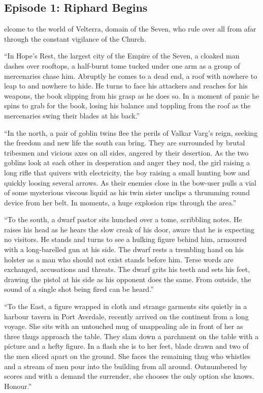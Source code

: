 \subsection{Episode 1: Riphard Begins}

elcome to the world of Velterra, domain of the Seven, who rule over all from afar through the constant vigilance of the Church.\medskip

“In Hope’s Rest, the largest city of the Empire of the Seven, a cloaked man dashes over rooftops, a half-burnt tome tucked under one arm as a group of mercenaries chase him. Abruptly he comes to a dead end, a roof with nowhere to leap to and nowhere to hide. He turns to face his attackers and reaches for his weapons, the book slipping from his grasp as he does so. In a moment of panic he spins to grab for the book, losing his balance and toppling from the roof as the mercenaries swing their blades at his back.”\medskip

“In the north, a pair of goblin twins flee the perils of Valkar Varg’s reign, seeking the freedom and new life the south can bring. They are surrounded by brutal tribesmen and vicious axes on all sides, angered by their desertion. As the two goblins look at each other in desperation and anger they nod, the girl raising a long rifle that quivers with electricity, the boy raising a small hunting bow and quickly loosing several arrows. As their enemies close in the bow-user pulls a vial of some mysterious viscous liquid as his twin sister unclips a thrumming round device from her belt. In moments, a huge explosion rips through the area.”\medskip

“To the south, a dwarf pastor sits hunched over a tome, scribbling notes. He raises his head as he hears the slow creak of his door, aware that he is expecting no visitors. He stands and turns to see a hulking figure behind him, armoured with a long-barelled gun at his side. The dwarf rests a trembling hand on his holster as a man who should not exist stands before him. Terse words are exchanged, accusations and threats. The dwarf grits his teeth and sets his feet, drawing the pistol at his side as his opponent does the same. From outside, the sound of a single shot being fired can be heard.”\medskip

“To the East, a figure wrapped in cloth and strange garments sits quietly in a harbour tavern in Port Averdale, recently arrived on the continent from a long voyage. She sits with an untouched mug of unappealing ale in front of her as three thugs approach the table. They slam down a parchment on the table with a picture and a hefty figure. In a flash she is to her feet, blade drawn and two of the men sliced apart on the ground. She faces the remaining thug who whistles and a stream of men pour into the building from all around. Outnumbered by scores and with a demand the surrender, she chooses the only option she knows. Honour.”\medskip

